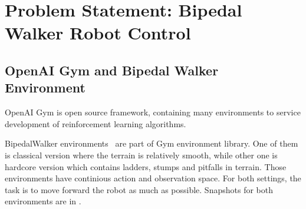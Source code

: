 \section{Problem Statement: Bipedal Walker Robot Control}
\label{sec:problem_statement}


\subsection{OpenAI Gym and Bipedal Walker Environment}
\label{ssec:gym_bipedal}

OpenAI Gym \cite{brockman_openai_2016} is open source framework, 
containing many environments to service development of 
reinforcement learning algorithms. 

BipedalWalker environments~\cite{noauthor_bipedalwalker-v2_2021, noauthor_bipedalwalkerhardcore-v2_2021} are part of Gym environment library. 
One of them is classical version where the terrain is relatively smooth, while other one is hardcore version which contains ladders, stumps and pitfalls in terrain. 
Those environments have continious action and observation space. 
For both settings, the task is to move forward the robot as much as possible. 
Snapshots for both environments are in .
